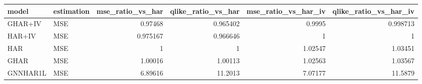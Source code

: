 \begin{tabular}{llrrrr}
\toprule
model & estimation & mse_ratio_vs_har & qlike_ratio_vs_har & mse_ratio_vs_har_iv & qlike_ratio_vs_har_iv \\
\midrule
GHAR+IV & MSE & 0.97468 & 0.965402 & 0.9995 & 0.998713 \\
HAR+IV & MSE & 0.975167 & 0.966646 & 1 & 1 \\
HAR & MSE & 1 & 1 & 1.02547 & 1.03451 \\
GHAR & MSE & 1.00016 & 1.00113 & 1.02563 & 1.03567 \\
GNNHAR1L & MSE & 6.89616 & 11.2013 & 7.07177 & 11.5879 \\
\bottomrule
\end{tabular}
